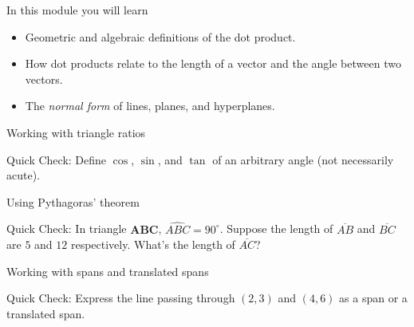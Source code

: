 \begin{module}

	In this module you will learn
	\begin{itemize}
		\item Geometric and algebraic definitions of the dot product.
		\item How dot products relate to the length of a vector and the angle
			between two vectors.
		\item The \emph{normal form} of lines, planes, and hyperplanes.
	\end{itemize}

	\begin{beforeyouread}
		\item Working with triangle ratios

		\item[] Quick Check: Define $\cos$, $\sin$, and $\tan$ of an arbitrary angle
			(not necessarily acute).

		\item Using Pythagoras' theorem

		\item[] Quick Check: In triangle $\mathbf{ABC}$, $\widehat{ABC}=90^{\circ}$.
			Suppose the length of $\overline{AB}$ and $\overline{BC}$ are $5$ and
			$12$ respectively. What's the length of $\overline{AC}$?

		\item Working with spans and translated spans

		\item[] Quick Check: Express the line passing through $(2,3)$ and $(4,6)$ as a span or a translated
			span.
	\end{beforeyouread}

	
	
\end{module}

